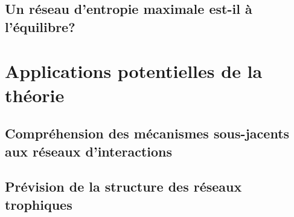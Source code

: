 \subsection{Un réseau d'entropie maximale est-il à l'équilibre?} 



\section{Applications potentielles de la théorie} 

\subsection{Compréhension des mécanismes sous-jacents aux réseaux d'interactions} 

\subsection{Prévision de la structure des réseaux trophiques} 


\endinput
